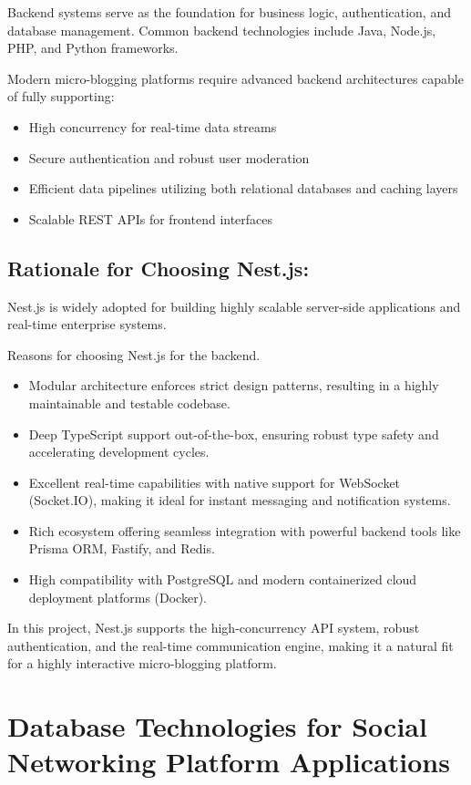 Backend systems serve as the foundation for business logic, authentication, and database management. Common backend technologies include Java, Node.js, PHP, and Python frameworks.

Modern micro-blogging platforms require advanced backend architectures capable of fully supporting:
\begin{itemize}
  \item High concurrency for real-time data streams
  \item Secure authentication and robust user moderation
  \item Efficient data pipelines utilizing both relational databases and caching layers
  \item Scalable REST APIs for frontend interfaces
\end{itemize}

\subsection{Rationale for Choosing Nest.js:}

Nest.js is widely adopted for building highly scalable server-side applications and real-time enterprise systems.

Reasons for choosing Nest.js for the backend.
\begin{itemize}
  \item Modular architecture enforces strict design patterns, resulting in a highly maintainable and testable codebase.
  \item Deep TypeScript support out-of-the-box, ensuring robust type safety and accelerating development cycles.
  \item Excellent real-time capabilities with native support for WebSocket (Socket.IO), making it ideal for instant messaging and notification systems.
  \item Rich ecosystem offering seamless integration with powerful backend tools like Prisma ORM, Fastify, and Redis.
  \item High compatibility with PostgreSQL and modern containerized cloud deployment platforms (Docker).
\end{itemize}

In this project, Nest.js supports the high-concurrency API system, robust authentication, and the real-time communication engine, making it a natural fit for a highly interactive micro-blogging platform.

\section{Database Technologies for Social Networking Platform Applications}

